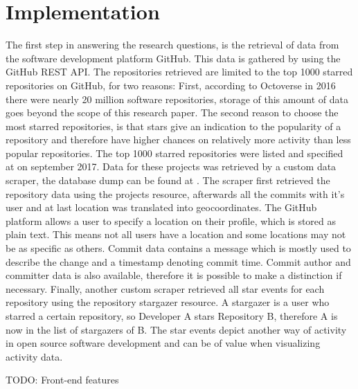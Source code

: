 \documentclass[acmtog, authorversion]{acmart}
\begin{document}
\section{Implementation}
The first step in answering the research questions, is the retrieval of data from the software development platform GitHub.
This data is gathered by using the GitHub REST API\cite{GHAPI}.
The repositories retrieved are limited to the top 1000 starred repositories on GitHub, for two reasons:
First, according to Octoverse \cite{GHOctoverse} in 2016 there were nearly 20 million software repositories, storage of this amount of data goes beyond the scope of this research paper.
The second reason to choose the most starred repositories, is that stars give an indication to the popularity of a repository and therefore have higher chances on relatively more activity than less popular repositories. 
The top 1000 starred repositories were listed and specified at \cite{gitstar} on september 2017.
Data for these projects was retrieved by a custom data scraper, the database dump can be found at  \cite{githubvisualizerovertime}. 
The scraper first retrieved the repository data using the projects resource\cite{GHAPI}, afterwards all the commits with it’s user and at last location was translated into geocoordinates.
The GitHub platform allows a user to specify a location on their profile, which is stored as plain text.
This means not all users have a location and some locations may not be as specific as others.
Commit data contains a message which is mostly used to describe the change and a timestamp denoting commit time.
Commit author and committer data is also available, therefore it is possible to make a distinction if necessary.
Finally, another custom scraper retrieved all star events for each repository using the repository stargazer resource\cite{GHAPI}.
A stargazer is a user who starred a certain repository, so Developer A stars Repository B, therefore A is now in the list of stargazers of B. 
The star events depict another way of activity in open source software development and can be of value when visualizing activity data.

TODO: Front-end features
\end{document}
